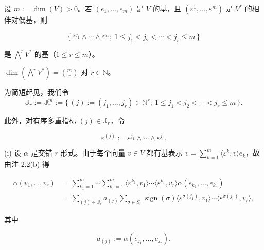 \begin{proposition}

\begin{subitems}
\item

设 $ m := \dim(V) > 0 $。若 $ (e_{1},\ldots,e_{m}) $ 是 $ V $ 的基，且 $ (\varepsilon^{1},\ldots,\varepsilon^{m}) $ 是 $ V^{*} $ 的相伴对偶基，则

\[
\{\, \varepsilon^{j_{1}}\wedge\cdots\wedge\varepsilon^{j_{r}} ;\ 1 \le j_{1} < j_{2} < \cdots < j_{r} \le m \,\}
\]

是 $ \bigwedge^{r}V^{*} $ 的基（$ 1 \le r \le m $）。

\item

$ \dim\left(\bigwedge^{r}V^{*}\right) = \binom{m}{r} $ 对 $ r \in \mathbb{N} $。

\proofhead
为简短起见，我们令
\[
\mathbb{J}_{r} := \mathbb{J}_{r}^{m} := \{\, (j) := (j_{1},\ldots,j_{r}) \in \mathbb{N}^{r} ;\ 1 \le j_{1} < j_{2} < \cdots < j_{r} \le m \,\}.
\]

此外，对有序多重指标 $ (j) \in \mathbb{J}_{r} $，令

\[
\varepsilon^{(j)} := \varepsilon^{j_{1}}\wedge\cdots\wedge\varepsilon^{j_{r}}.
\]
\end{subitems}

(i) 设 $ \alpha $ 是交错 $ r $ 形式。由于每个向量 $ v \in V $ 都有基表示 $ v = \sum_{k=1}^{m}\langle\varepsilon^{k},v\rangle e_{k} $，故由注 2.2(b) 得

\begin{equation*}
\begin{aligned}
\alpha(v_{1},\ldots,v_{r}) &= \sum_{k_{1}=1}^{m}\cdots\sum_{k_{r}=1}^{m}\langle\varepsilon^{k_{1}},v_{1}\rangle\cdots\langle\varepsilon^{k_{r}},v_{r}\rangle\alpha(e_{k_{1}},\ldots,e_{k_{r}}) \\ &= \sum_{(j)\in\mathbb{J}_{r}} a_{(j)} \sum_{\sigma\in S_{r}} \operatorname{sign}(\sigma)\langle\varepsilon^{\sigma(j_{1})},v_{1}\rangle\cdots\langle\varepsilon^{\sigma(j_{r})},v_{r}\rangle,
\end{aligned}
\end{equation*}

其中

\begin{equation}
a_{(j)} := \alpha(e_{j_{1}},\ldots,e_{j_{r}}).\tag{2.4}
\end{equation}


\end{proposition}
